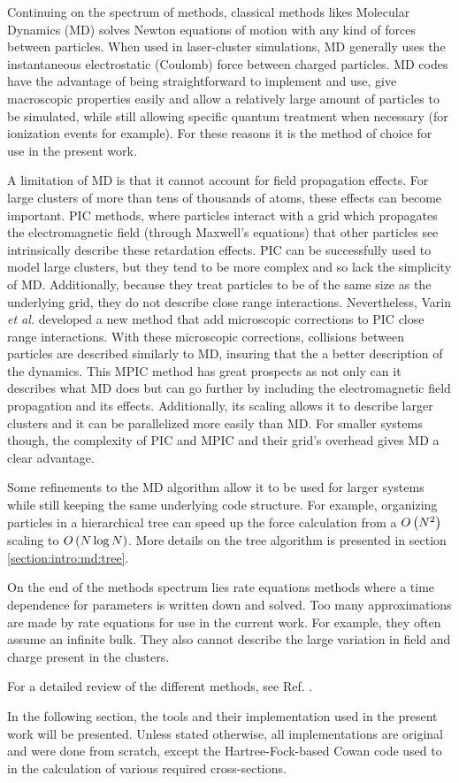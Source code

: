 Continuing on the spectrum of methods, classical methods likes Molecular
Dynamics (MD) solves Newton
equations of motion with any kind of forces between particles\cite{Skeel1998}.
When used in
laser-cluster simulations, MD generally uses the instantaneous electrostatic
(Coulomb) force between charged particles. MD codes have the advantage of being
straightforward to implement and use, give macroscopic properties easily and allow a
relatively large amount of particles to be simulated, while still allowing
specific quantum treatment when necessary (for ionization events for example). For
these reasons it is the method of choice for use in the present work.

A limitation of MD is that it cannot account for field propagation effects. For
large clusters of more than tens of thousands of atoms, these effects can become
important. PIC methods, where particles interact with a grid which propagates the
electromagnetic field (through Maxwell's equations) that other particles see
intrinsically describe these retardation effects. PIC can be successfully used
to model large clusters, but they tend to be more complex and so lack the
simplicity of MD. Additionally, because they treat particles to be of the same
size as the underlying grid, they do not describe close range interactions.
Nevertheless, Varin \textit{et al.} developed a new method that add microscopic
corrections to PIC close range interactions\cite{Varin2012}. With these microscopic
corrections, collisions between particles are described similarly to MD, insuring
that the a better description of the dynamics. This MPIC method has great prospects
as not only can it describes what MD does but can go further by including the
electromagnetic field propagation and its effects. Additionally, its scaling
allows it to describe larger clusters and it can be parallelized more easily
than MD. For smaller systems though, the complexity of PIC and MPIC and their
grid's overhead gives MD a clear advantage.

Some refinements to the MD algorithm allow it to be used for larger systems
while still keeping the same underlying code structure. For example, organizing
particles in a hierarchical tree\cite{Barnes1986,Gibbon2002} can speed up the force
calculation from a $O\left( N^2 \right)$ scaling to $O\left( N \log{N} \right)$. More details on the
tree algorithm is presented in section \ref{section:intro:md:tree}.

On the end of the methods spectrum lies rate equations methods where a time
dependence for parameters is written down and solved. Too many approximations
are made by rate equations for use in the current work. For example, they often
assume an infinite bulk. They also cannot describe the large variation in field
and charge present in the clusters.

For a detailed review of the different methods, see Ref. \cite{Fennel2010}.

In the following section, the tools and their implementation used in the present
work will be presented. Unless stated otherwise, all implementations are original
and were done from scratch, except the Hartree-Fock-based Cowan code\cite{CowanCode} used to
in the calculation of various required cross-sections.


